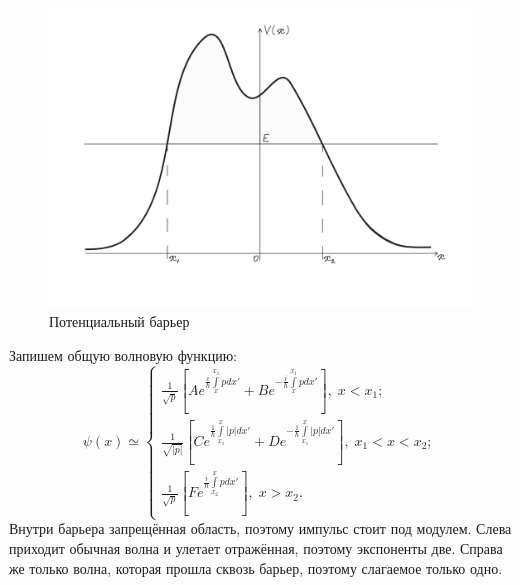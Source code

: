 \begin{figure}[h!]
\centering
\includegraphics[scale=0.16]{appendix/images/barier.jpg}
\caption{Потенциальный барьер}
\label{fig C.2}
\end{figure}

Запишем общую волновую функцию:
\[
\psi(x) \simeq 
\begin{cases}
    \frac{1}{\sqrt{p}}\left[ Ae^{\frac{i}{\hbar}\int\limits_x^{x_1} p dx'} + Be^{-\frac{i}{\hbar}\int\limits_x^{x_1} p dx'} \right],\; x<x_1;\\
    \frac{1}{\sqrt{|p|}}\left[ Ce^{\frac{1}{\hbar}\int\limits_{x_1}^{x} |p| dx'} + De^{-\frac{1}{\hbar}\int\limits_{x_1}^{x} |p| dx'} \right],\; x_1< x < x_2;\\
    \frac{1}{\sqrt{p}}\left[ Fe^{\frac{i}{\hbar}\int\limits_{x_2}^{x} p dx'}\right],\; x > x_2.
\end{cases}
\]
Внутри барьера запрещённая область, поэтому импульс стоит под модулем. Слева приходит обычная волна и улетает отражённая, поэтому экспоненты две. Справа же только волна, которая прошла сквозь барьер, поэтому слагаемое только одно. 

